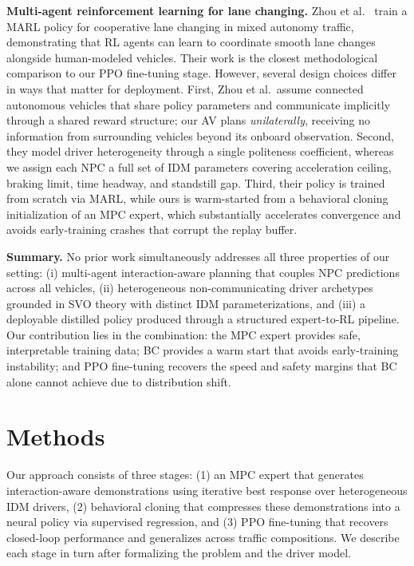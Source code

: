 \documentclass[conference]{IEEEtran}
\begin{document}
\textbf{Multi-agent reinforcement learning for lane changing.}
Zhou et al.\ \cite{zhou2022marl} train a MARL policy for cooperative lane
changing in mixed autonomy traffic, demonstrating that RL agents can learn
to coordinate smooth lane changes alongside human-modeled vehicles.
Their work is the closest methodological comparison to our PPO fine-tuning
stage.
However, several design choices differ in ways that matter for deployment.
First, Zhou et al.\ assume connected autonomous vehicles that share policy
parameters and communicate implicitly through a shared reward structure;
our AV plans \emph{unilaterally}, receiving no information from surrounding
vehicles beyond its onboard observation.
Second, they model driver heterogeneity through a single politeness
coefficient, whereas we assign each NPC a full set of IDM parameters
covering acceleration ceiling, braking limit, time headway, and standstill
gap.
Third, their policy is trained from scratch via MARL, while ours is
warm-started from a behavioral cloning initialization of an MPC expert,
which substantially accelerates convergence and avoids early-training
crashes that corrupt the replay buffer.

\textbf{Summary.}
No prior work simultaneously addresses all three properties of our
setting: (i) multi-agent interaction-aware planning that couples NPC
predictions across all vehicles, (ii) heterogeneous non-communicating
driver archetypes grounded in SVO theory with distinct IDM
parameterizations, and (iii) a deployable distilled policy produced
through a structured expert-to-RL pipeline.
Our contribution lies in the combination: the MPC expert provides safe,
interpretable training data; BC provides a warm start that avoids
early-training instability; and PPO fine-tuning recovers the speed and
safety margins that BC alone cannot achieve due to distribution shift.

\section{Methods}
\label{sec:methods}

Our approach consists of three stages: (1) an MPC expert that generates
interaction-aware demonstrations using iterative best response over
heterogeneous IDM drivers, (2) behavioral cloning that compresses these
demonstrations into a neural policy via supervised regression, and (3)
PPO fine-tuning that recovers closed-loop performance and generalizes
across traffic compositions.
We describe each stage in turn after formalizing the problem and the
driver model.
\end{document}
